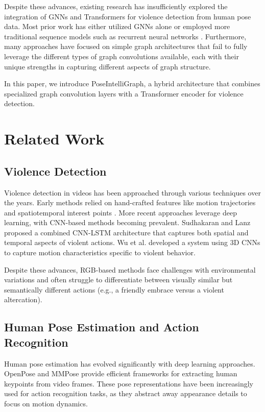 \documentclass[conference]{IEEEtran}
\begin{document}
Despite these advances, existing research has insufficiently explored the
integration of GNNs and Transformers for violence detection from human pose
data. Most prior work has either utilized GNNs alone \cite{yan2018spatial} or
employed more traditional sequence models such as recurrent neural networks
\cite{li2019actional}. Furthermore, many approaches have focused on simple
graph architectures that fail to fully leverage the different types of graph
convolutions available, each with their unique strengths in capturing different
aspects of graph structure.

In this paper, we introduce PoseIntelliGraph, a hybrid architecture that
combines specialized graph convolution layers with a Transformer encoder for
violence detection.

\section{Related Work}
\subsection{Violence Detection}
Violence detection in videos has been approached through various techniques
over the years. Early methods relied on hand-crafted features like motion
trajectories and spatiotemporal interest points \cite{nievas2011violence}. More
recent approaches leverage deep learning, with CNN-based methods becoming
prevalent. Sudhakaran and Lanz \cite{sudhakaran2017learning} proposed a
combined CNN-LSTM architecture that captures both spatial and temporal aspects
of violent actions. Wu et al. \cite{wu2020not} developed a system using 3D CNNs
to capture motion characteristics specific to violent behavior.

Despite these advances, RGB-based methods face challenges with environmental
variations and often struggle to differentiate between visually similar but
semantically different actions (e.g., a friendly embrace versus a violent
altercation).

\subsection{Human Pose Estimation and Action Recognition}
Human pose estimation has evolved significantly with deep learning approaches.
OpenPose \cite{cao2017realtime} and MMPose \cite{mmpose2020} provide efficient
frameworks for extracting human keypoints from video frames. These pose
representations have been increasingly used for action recognition tasks, as
they abstract away appearance details to focus on motion dynamics.
\end{document}
